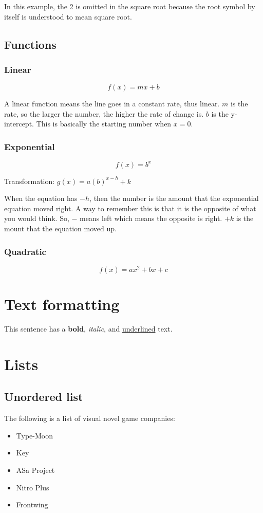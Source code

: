 \documentclass[letterpaper, 12pt]{article}
\begin{document}
In this example, the 2 is omitted in the square root because the root symbol by itself is understood to mean square root.

\subsection{Functions}
\subsubsection{Linear}
\begin{equation}
    f(x) = mx + b
\end{equation}

A linear function means the line goes in a constant rate, thus linear.
$m$ is the rate, so the larger the number, the higher the rate of change is.
$b$ is the y-intercept. This is basically the starting number when $x = 0$.

\subsubsection{Exponential}
\begin{equation}
    f(x) = b^x
\end{equation}

Transformation: $g(x) = a(b)^{x-h} + k$

When the equation has $-h$, then the number is the amount that the exponential equation moved right.
A way to remember this is that it is the opposite of what you would think.
So, $-$ means left which means the opposite is right.
$+ k$ is the mount that the equation moved up.

\subsubsection{Quadratic}
\begin{equation}
    f(x) = ax^2 + bx + c
\end{equation}

\section{Text formatting}
This sentence has a \textbf{bold}, \textit{italic}, and \underline{underlined} text.

\section{Lists}
\subsection{Unordered list}
The following is a list of visual novel game companies:
\begin{itemize}
    \item Type-Moon
    \item Key
    \item ASa Project
    \item Nitro Plus
    \item Frontwing
\end{itemize}
\end{document}
